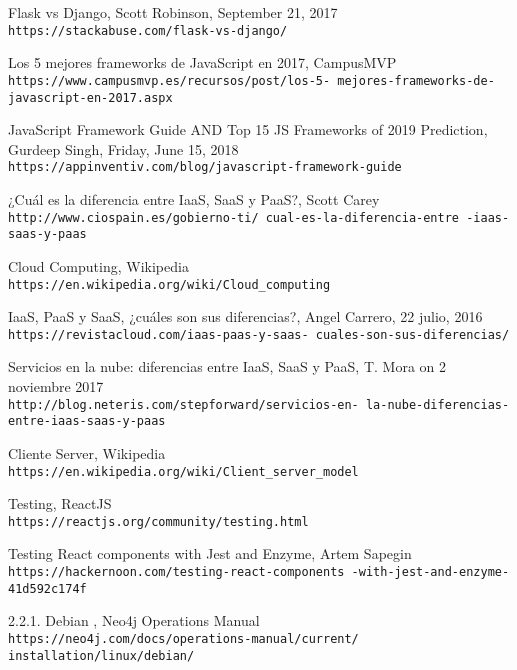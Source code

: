 \begin{thebibliography}{999}
Flask vs Django, Scott Robinson, September 21, 2017
\\\texttt{https://stackabuse.com/flask-vs-django/}

Los 5 mejores frameworks de JavaScript en 2017, CampusMVP
\\\texttt{https://www.campusmvp.es/recursos/post/los-5-
mejores-frameworks-de-javascript-en-2017.aspx}

JavaScript Framework Guide AND Top 15 JS Frameworks of 2019 Prediction, Gurdeep Singh, Friday, June 15, 2018
\\\texttt{https://appinventiv.com/blog/javascript-framework-guide}

¿Cuál es la diferencia entre IaaS, SaaS y PaaS?, Scott Carey
\\\texttt{http://www.ciospain.es/gobierno-ti/
cual-es-la-diferencia-entre
-iaas-saas-y-paas}

Cloud Computing, Wikipedia
\\\texttt{https://en.wikipedia.org/wiki/Cloud\_computing}

IaaS, PaaS y SaaS, ¿cuáles son sus diferencias?, Angel Carrero, 22 julio, 2016 
\\\texttt{https://revistacloud.com/iaas-paas-y-saas-
cuales-son-sus-diferencias/}

Servicios en la nube: diferencias entre IaaS, SaaS y PaaS,  T. Mora on 2 noviembre 2017 
\\\texttt{http://blog.neteris.com/stepforward/servicios-en-
la-nube-diferencias-entre-iaas-saas-y-paas}

Cliente Server, Wikipedia
\\\texttt{https://en.wikipedia.org/wiki/Client\_server\_model}

Testing, ReactJS
\\\texttt{https://reactjs.org/community/testing.html}

Testing React components with Jest and Enzyme, Artem Sapegin
\\\texttt{https://hackernoon.com/testing-react-components
-with-jest-and-enzyme-41d592c174f}

2.2.1. Debian , Neo4j Operations Manual
\\\texttt{https://neo4j.com/docs/operations-manual/current/
installation/linux/debian/}


\end{thebibliography}
